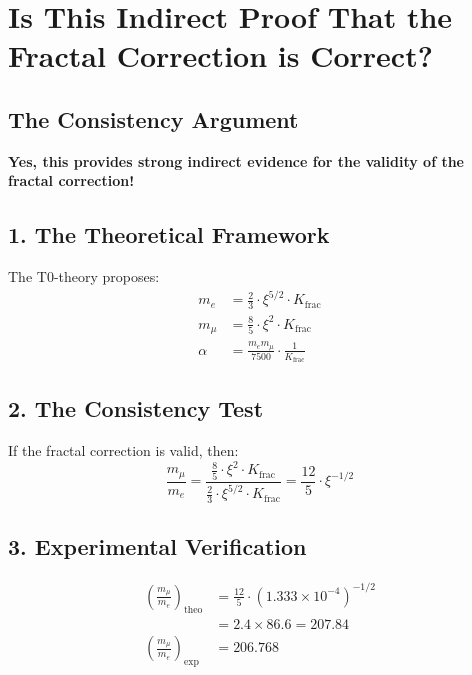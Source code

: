 \documentclass[12pt,a4paper]{article}
\begin{document}
	
	\section*{Is This Indirect Proof That the Fractal Correction is Correct?}
	
	\subsection*{The Consistency Argument}
	
	\begin{tcolorbox}[colback=green!5!white,colframe=green!75!black]
		\textbf{Yes, this provides strong indirect evidence for the validity of the fractal correction!}
	\end{tcolorbox}
	
	\subsection*{1. The Theoretical Framework}
	
	The T0-theory proposes:
	\begin{align*}
		m_e &= \frac{2}{3} \cdot \xi^{5/2} \cdot K_{\text{frac}} \\
		m_\mu &= \frac{8}{5} \cdot \xi^2 \cdot K_{\text{frac}} \\
		\alpha &= \frac{m_e m_\mu}{7500} \cdot \frac{1}{K_{\text{frac}}}
	\end{align*}
	
	\subsection*{2. The Consistency Test}
	
	If the fractal correction is valid, then:
	\[
	\frac{m_\mu}{m_e} = \frac{\frac{8}{5} \cdot \xi^2 \cdot K_{\text{frac}}}{\frac{2}{3} \cdot \xi^{5/2} \cdot K_{\text{frac}}} = \frac{12}{5} \cdot \xi^{-1/2}
	\]
	
	\subsection*{3. Experimental Verification}
	
	\begin{align*}
		\left(\frac{m_\mu}{m_e}\right)_{\text{theo}} &= \frac{12}{5} \cdot (1.333 \times 10^{-4})^{-1/2} \\
		&= 2.4 \times 86.6 = 207.84 \\
		\left(\frac{m_\mu}{m_e}\right)_{\text{exp}} &= 206.768
	\end{align*}
	
\end{document}

